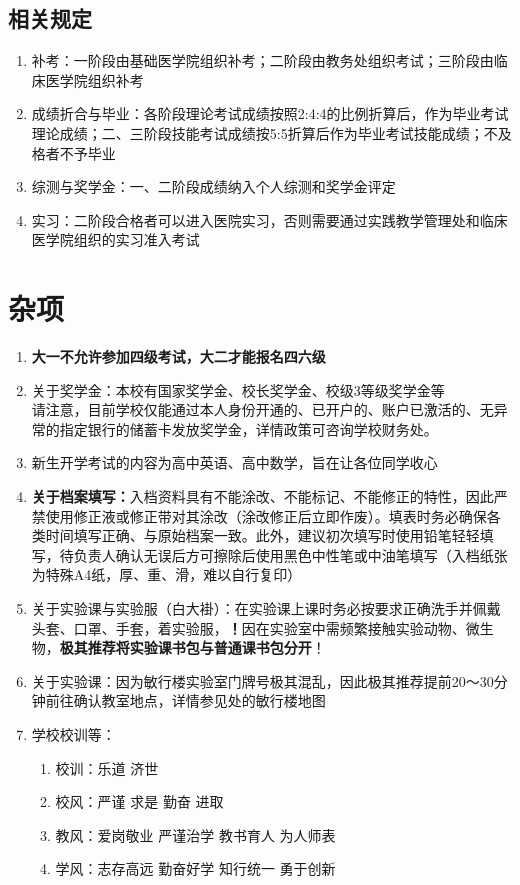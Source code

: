 \subsection[相关规定]{相关规定}
\label{other_rules_exam}
\begin{enumerate}
    \item 补考：一阶段由基础医学院组织补考；二阶段由教务处组织考试；三阶段由临床医学院组织补考
    \item 成绩折合与毕业：各阶段理论考试成绩按照2:4:4的比例折算后，作为毕业考试理论成绩；二、三阶段技能考试成绩按5:5折算后作为毕业考试技能成绩；不及格者不予毕业
    \item 综测与奖学金：一、二阶段成绩纳入个人综测和奖学金评定
    \item 实习：二阶段合格者可以进入医院实习，否则需要通过实践教学管理处和临床医学院组织的实习准入考试
\end{enumerate}

\section[杂项]{杂项}
\begin{enumerate}
    \item \textbf{大一不允许参加四级考试，大二才能报名四六级}
    \item 关于奖学金：本校有国家奖学金、校长奖学金、校级3等级奖学金等\\
          请注意，目前学校仅能通过本人身份开通的、已开户的、账户已激活的、无异常的指定银行的储蓄卡发放奖学金，详情政策可咨询学校财务处。
    \item 新生开学考试\footnotemark 的内容为高中英语、高中数学，旨在让各位同学收心
    \item \textbf{关于档案填写：}入档资料具有不能涂改、不能标记、不能修正的特性，因此严禁使用修正液或修正带对其涂改（涂改修正后立即作废）。填表时务必确保各类时间填写正确、与原始档案一致。此外，建议初次填写时使用铅笔轻轻填写，待负责人确认无误后方可擦除后使用黑色中性笔或中油笔填写（入档纸张为特殊A4纸，厚、重、滑，难以自行复印）
    \item 关于实验课与实验服（白大褂）：在实验课上课时务必按要求正确洗手并佩戴头套、口罩、手套，着实验服，\textbf{！}因在实验室中需频繁接触实验动物、微生物，\textbf{极其推荐将实验课书包与普通课书包分开}！\label{schoolbag}
    \item 关于实验课：因为敏行楼实验室门牌号极其混乱，因此极其推荐提前20～30分钟前往确认教室地点，详情参见处的敏行楼地图
    \item 学校校训等：
          \begin{enumerate}
              \item 校训：乐道 济世
              \item 校风：严谨 求是 勤奋 进取
              \item 教风：爱岗敬业 严谨治学 教书育人 为人师表
              \item 学风：志存高远 勤奋好学 知行统一 勇于创新
          \end{enumerate}
\end{enumerate}
